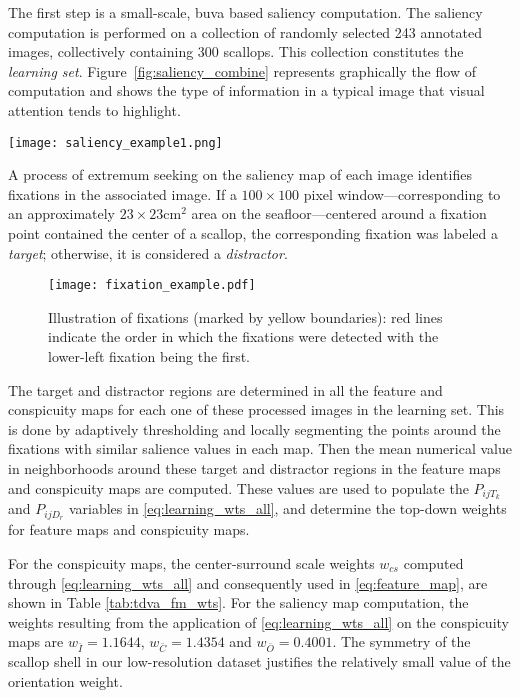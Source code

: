 The first step is a small-scale, \gls{buva} based saliency computation. 
The saliency computation is performed 
on a collection of randomly selected 243 annotated images, collectively containing 300 scallops.
This collection constitutes the \emph{learning set}.
Figure~\ref{fig:saliency_combine} represents graphically the flow of computation
and shows the type of information in a typical image that visual attention tends to highlight.
%
\begin{figure*}
\vskip -5pt
\centering
\texttt{[image: saliency\_example1.png]}
\caption{Illustration of computation flow for the construction of saliency maps}
\label{fig:saliency_combine}
\end{figure*}
%

A process of extremum
seeking on the saliency map of each image identifies fixations in the associated image.
If a $100\times100$ pixel window---corresponding to an approximately $23 \times 23$\enspace cm$^2$ area on the seafloor---centered around a fixation point
contained the center of a scallop, the corresponding 
fixation was labeled a \emph{target}; otherwise, it is considered a \emph{distractor}.

\begin{figure} 
\centering
\texttt{[image: fixation\_example.pdf]}
\caption[Illustration of fixations]{Illustration of fixations (marked by yellow boundaries):
         red lines indicate the order in which the fixations were detected with the lower-left fixation being the first.
}
\label{fig:fixation}
\end{figure}

The target and distractor regions are determined in all the feature and conspicuity maps for each one of these processed images in the learning set.
This is done by adaptively thresholding and locally segmenting the points around the fixations with similar salience values in each map.
Then the mean numerical value in neighborhoods around  
these target and distractor regions in the feature maps and conspicuity maps 
are computed.  These values are used to populate the $P_{ijT_k}$ and $P_{ijD_r}$ variables in \eqref{eq:learning_wts_all}, and determine the top-down weights for feature maps and conspicuity maps.

For the conspicuity maps, the center-surround scale weights $w_{cs}$ computed through \eqref{eq:learning_wts_all} and consequently used in \eqref{eq:feature_map},
are shown in Table \ref{tab:tdva_fm_wts}.
For the saliency map computation, the weights resulting from the application of
\eqref{eq:learning_wts_all} on the conspicuity maps are
$w_{\bar{I}}= 1.1644$, $w_{\bar{C}}= 1.4354$ and $w_{\bar{O}}= 0.4001$.  
The symmetry of the scallop shell in our low-resolution dataset 
justifies the relatively small value of the orientation weight.

